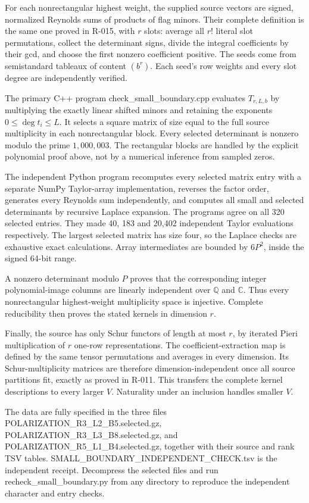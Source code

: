 \documentclass[
  10pt,
]{article}
\begin{document}
For each nonrectangular highest weight, the supplied source vectors are
signed, normalized Reynolds sums of products of flag minors. Their
complete definition is the same one proved in R-015, with \(r\) slots:
average all \(r!\) literal slot permutations, collect the determinant
signs, divide the integral coefficients by their gcd, and choose the
first nonzero coefficient positive. The seeds come from semistandard
tableaux of content \((b^r)\). Each seed's row weights and every slot
degree are independently verified.

The primary C++ program check\_small\_boundary.cpp evaluates
\(T_{r,L,b}\) by multiplying the exactly linear shifted minors and
retaining the exponents \(0\le\deg t_i\le L\). It selects a square
matrix of size equal to the full source multiplicity in each
nonrectangular block. Every selected determinant is nonzero modulo the
prime \(1,000,003\). The rectangular blocks are handled by the explicit
polynomial proof above, not by a numerical inference from sampled zeros.

The independent Python program recomputes every selected matrix entry
with a separate NumPy Taylor-array implementation, reverses the factor
order, generates every Reynolds sum independently, and computes all
small and selected determinants by recursive Laplace expansion. The
programs agree on all 320 selected entries. They made 40, 183 and 20,402
independent Taylor evaluations respectively. The largest selected matrix
has size four, so the Laplace checks are exhaustive exact calculations.
Array intermediates are bounded by \(6P^2\), inside the signed 64-bit
range.

A nonzero determinant modulo \(P\) proves that the corresponding integer
polynomial-image columns are linearly independent over \(\mathbb Q\) and
\(\mathbb C\). Thus every nonrectangular highest-weight multiplicity
space is injective. Complete reducibility then proves the stated kernels
in dimension \(r\).

Finally, the source has only Schur functors of length at most \(r\), by
iterated Pieri multiplication of \(r\) one-row representations. The
coefficient-extraction map is defined by the same tensor permutations
and averages in every dimension. Its Schur-multiplicity matrices are
therefore dimension-independent once all source partitions fit, exactly
as proved in R-011. This transfers the complete kernel descriptions to
every larger \(V\). Naturality under an inclusion handles smaller \(V\).

The data are fully specified in the three files
POLARIZATION\_R3\_L2\_B5.selected.gz,
POLARIZATION\_R3\_L3\_B8.selected.gz, and
POLARIZATION\_R5\_L1\_B4.selected.gz, together with their source and
rank TSV tables. SMALL\_BOUNDARY\_INDEPENDENT\_CHECK.tsv is the
independent receipt. Decompress the selected files and run
recheck\_small\_boundary.py from any directory to reproduce the
independent character and entry checks.
\end{document}
